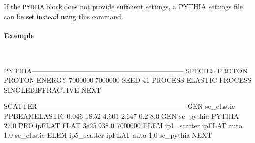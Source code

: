 If the \texttt{PYTHIA} block does not provide sufficient settings, a PYTHIA settings file can be set instead using this command.

\paragraph{Example}~\\
\begin{cverbatim}
PYTHIA------------------------------------------------------------------
  SPECIES PROTON PROTON
  ENERGY 7000000 7000000
  SEED 41
  PROCESS ELASTIC
  PROCESS SINGLEDIFFRACTIVE
NEXT

SCATTER-----------------------------------------------------------------
  GEN  sc_elastic  PPBEAMELASTIC 0.046  18.52  4.601  2.647  0.2  8.0
  GEN  sc_pythia   PYTHIA  27.0
  PRO  ipFLAT      FLAT   3e25  938.0  7000000
  ELEM ip1_scatter ipFLAT auto 1.0 sc_elastic
  ELEM ip5_scatter ipFLAT auto 1.0 sc_pythia
NEXT
\end{cverbatim}
